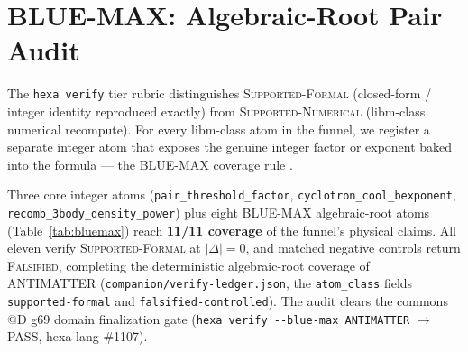 \documentclass[11pt,a4paper]{article}
\begin{document}
\section{BLUE-MAX: Algebraic-Root Pair Audit}
\label{sec:bluemax}

The \texttt{hexa verify} tier rubric distinguishes \textsc{Supported-Formal}
(closed-form / integer identity reproduced exactly) from
\textsc{Supported-Numerical} (libm-class numerical recompute). For every
libm-class atom in the funnel, we register a separate integer atom that
exposes the genuine integer factor or exponent baked into the formula ---
the BLUE-MAX coverage rule \citep{anthropic2026hexag69}.

Three core integer atoms (\verb|pair_threshold_factor|,
\verb|cyclotron_cool_bexponent|, \verb|recomb_3body_density_power|) plus
eight BLUE-MAX algebraic-root atoms (Table~\ref{tab:bluemax}) reach
\textbf{11/11 coverage} of the funnel's physical claims. All eleven verify
\textsc{Supported-Formal} at $|\Delta|=0$, and matched negative controls
return \textsc{Falsified}, completing the deterministic algebraic-root
coverage of ANTIMATTER (\texttt{companion/verify-ledger.json}, the
\verb|atom_class| fields \texttt{supported-formal} and
\texttt{falsified-controlled}). The audit clears the commons @D g69 domain
finalization gate (\verb|hexa verify --blue-max ANTIMATTER| $\to$ PASS,
hexa-lang \#1107).
\end{document}
